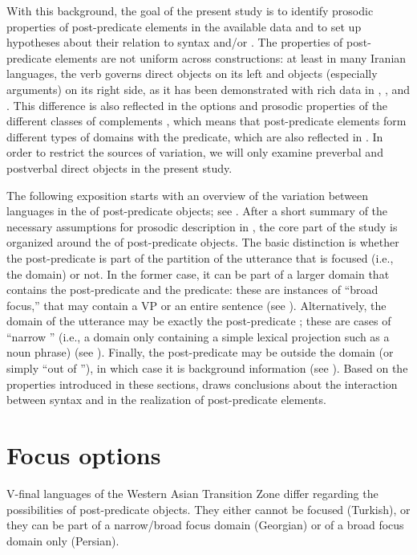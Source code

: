 \documentclass[output=paper,colorlinks,citecolor=brown]{langscibook}
\begin{document}
With this background, the goal of the present study is to identify prosodic properties of post-predicate elements in the available data and to set up hypotheses about their relation to syntax and/or . The properties of post-predicate elements are not uniform across constructions: at least in many Iranian languages, the verb governs direct objects on its left and  objects (especially  arguments) on its right side, as it has been demonstrated with rich data in \citet{HaigRasekhMahand2019}, \citet{haig_which_2023}, and . This difference is also reflected in the  options and prosodic properties of the different classes of complements \citep[138--139]{sadat-tehrani_intonational_2007}, which means that post-predicate elements form different types of domains with the predicate, which are also reflected in . In order to restrict the sources of variation, we will only examine preverbal and postverbal direct objects in the present study.

The following exposition starts with an overview of the variation between languages in the  of post-predicate objects; see . After a short summary of the necessary assumptions for prosodic description in , the core part of the study is organized around the  of post-predicate objects. The basic distinction is whether the post-predicate  is part of the partition of the utterance that is focused (i.e., the  domain) or not. In the former case, it can be part of a larger  domain that contains the post-predicate and the predicate: these are instances of ``broad focus,'' that may contain a VP or an entire sentence (see ). Alternatively, the  domain of the utterance may be exactly the post-predicate ; these are cases of ``narrow '' (i.e., a  domain only containing a simple lexical projection such as a noun phrase) (see ). Finally, the post-predicate  may be outside the  domain (or simply ``out of ''), in which case it is background information (see ). Based on the properties introduced in these sections,  draws conclusions about the interaction between syntax and  in the realization of post-predicate elements.

\newpage
\section{Focus options} \label{sec:focusOptions}
\largerpage[-1]
V-final languages of the Western Asian Transition Zone differ regarding the  possibilities of post-predicate objects. They either cannot be focused (Turkish), or they can be part of a narrow/broad focus domain (Georgian) or of a broad focus domain only (Persian). 
\end{document}
